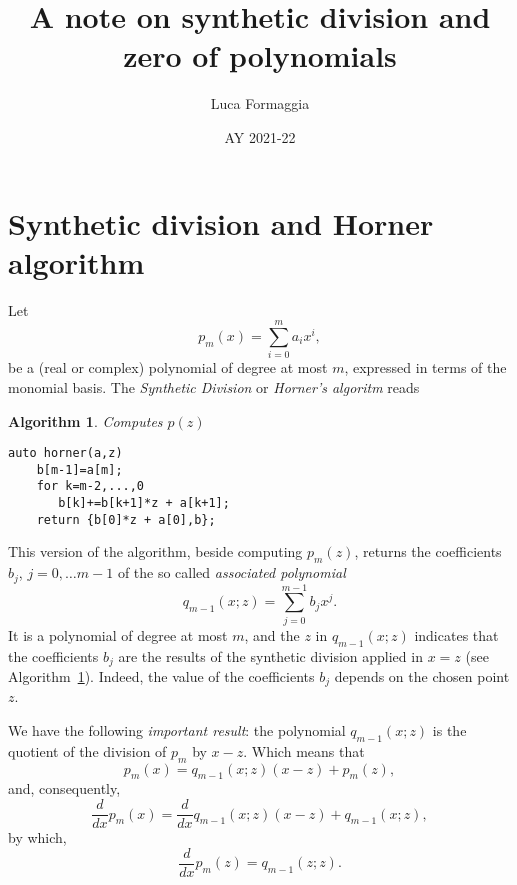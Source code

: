 \documentclass[10pt,a4paper]{article}
\author{Luca Formaggia}
\date{AY 2021-22}
\title{A note on synthetic division and zero of polynomials}
\theoremstyle{definition}%
\newtheorem{algo}{Algorithm}
\begin{document}
 
 \maketitle
 \section{Synthetic division and Horner algorithm}
 Let
 \[
 p_m(x)=\sum_{i=0}^{m} a_i x^i,
 \]
be a (real or complex) polynomial of degree at most $m$, expressed in terms of the monomial basis.
  The \emph{Synthetic Division} or \emph{Horner's algoritm} reads

\begin{algo}\label{alg:horner}
\emph{Computes $p(z)$}
\begin{lstlisting}
auto horner(a,z)
    b[m-1]=a[m];
    for k=m-2,...,0 
	   b[k]+=b[k+1]*z + a[k+1]; 
    return {b[0]*z + a[0],b}; 
\end{lstlisting}
\end{algo}
This version of the algorithm, beside computing $p_m(z)$,
  returns the coefficients $b_j$, $j=0,\ldots m-1$ of the so called \emph{associated polynomial}
\begin{equation}
\label{eq:associated}
q_{m-1}(x;z)=\sum_{j=0}^{m-1}b_j x^j.
\end{equation}
It is a polynomial of degree at most $m$, and the $z$ in $q_{m-1}(x;z)$ indicates
  that the coefficients $b_j$ are the results of the synthetic division applied in $x=z$ (see Algorithm~\ref{alg:horner}). Indeed, the value of the coefficients $b_j$ depends on the chosen point $z$.

We have the following \emph{important result}: the polynomial $q_{m-1}(x;z)$ is the quotient
  of the division of $p_m$ by $x-z$. Which means that
\begin{equation}
\label{eq:quotient}
\boxed{p_m(x)=q_{m-1}(x;z)(x-z) + p_m(z),}
\end{equation}
and, consequently,
\begin{equation}
\label{eq:quotientder}
\boxed{\frac{d}{dx}p_m(x)=\frac{d}{dx}q_{m-1}(x;z)(x-z) + q_{m-1}(x;z),}
\end{equation}
by which,
\begin{equation}
\label{eq:quotientdertwo}
\boxed{\frac{d}{dx}p_m(z)=q_{m-1}(z;z).}
\end{equation}
\end{document}
